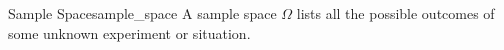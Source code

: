 \begin{definition}{Sample Space}{sample_space}
A sample space \( \Omega  \) lists all the possible outcomes of some unknown
experiment or situation.
\end{definition}
